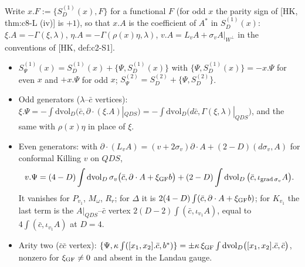 \begin{proposition}
\label{prop:gfvert}
Write $x.F:=\{S^{(1)}_D(x),F\}$ for a functional $F$ (for odd $x$ the parity sign of [HK, thm:c8-L (iv)] is $+1$), so that $x.A$ is the coefficient of $A^*$ in $S^{(1)}_D(x)$: $\xi.A=-\Gamma(\xi,\lambda)$, $\eta.A=-\Gamma(\rho(x)\eta,\lambda)$, $v.A=L_vA+\sigma_vA|_{W^\perp}$ in the conventions of [HK, def:c2-S1].
\begin{itemize}
\item[(i)] $S^{(1)}_{\Psi}(x)=S^{(1)}_D(x)+\{\Psi,S^{(1)}_D(x)\}$ with $\{\Psi,S^{(1)}_D(x)\}=-x.\Psi$ for even $x$ and $+x.\Psi$ for odd $x$; $S^{(2)}_\Psi=S^{(2)}_D+\{\Psi,S^{(2)}_D\}$.
\item[(ii)] Odd generators ($\lambda$--$\bar c$ vertices): $\xi.\Psi=-\int\mathrm{dvol}_D\big(\bar c,\partial\cdot(\xi.A)|_{QDS}\big)=-\int\mathrm{dvol}_D\big(d\bar c,\Gamma(\xi,\lambda)|_{QDS}\big)$, and the same with $\rho(x)\eta$ in place of $\xi$.
\item[(iii)] Even generators: with $\partial\cdot(L_vA)=(v+2\sigma_v)\partial\cdot A+(2-D)(d\sigma_v,A)$ for conformal Killing $v$ on $QDS$,
\[
v.\Psi=(4-D)\int\mathrm{dvol}_D\,\sigma_v\big(\bar c,\partial\cdot A+\xi_{\rm GF}b\big)+(2-D)\int\mathrm{dvol}_D\,\big(\bar c,\iota_{\mathrm{grad}\,\sigma_v}A\big).
\]
It vanishes for $P_{v_1}$, $M_\omega$, $R_r$; for $\Delta$ it is $2(4-D)\int(\bar c,\partial\cdot A+\xi_{\rm GF}b)$; for $K_{v_1}$ the last term is the $A|_{QDS}$--$\bar c$ vertex $2(D-2)\int(\bar c,\iota_{v_1}A)$, equal to $4\int(\bar c,\iota_{v_1}A)$ at $D=4$.
\item[(iv)] Arity two ($\bar c\bar c$ vertex): $\{\Psi,\kappa\int([x_1,x_2].\bar c,b^*)\}=\pm\kappa\,\xi_{\rm GF}\int\mathrm{dvol}_D\big([x_1,x_2].\bar c,\bar c\big)$, nonzero for $\xi_{\rm GF}\neq0$ and absent in the Landau gauge.
\end{itemize}
\end{proposition}

